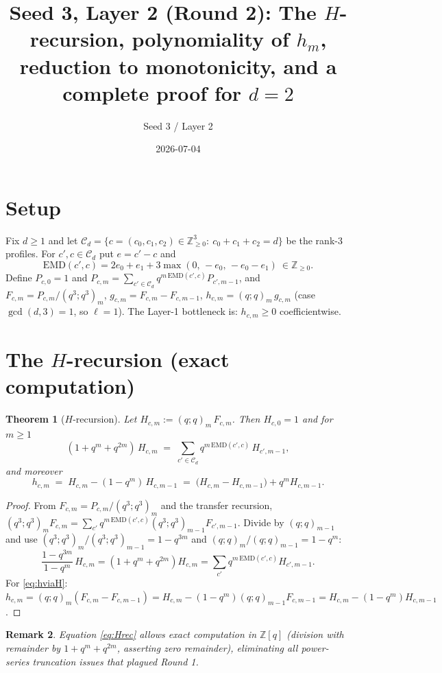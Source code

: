 \documentclass[11pt]{article}
\title{Seed 3, Layer 2 (Round 2): The $H$-recursion, polynomiality of $h_m$,\\
reduction to monotonicity, and a complete proof for $d=2$}
\author{Seed 3 / Layer 2}
\date{2026-07-04}
\newtheorem{theorem}{Theorem}
\newtheorem{remark}[theorem]{Remark}
\begin{document}
\maketitle

\section*{Setup}
Fix $d\ge 1$ and let $\mathcal{C}_d=\{c=(c_0,c_1,c_2)\in\mathbb{Z}_{\ge0}^3:\ c_0+c_1+c_2=d\}$
be the rank-3 profiles. For $c',c\in\mathcal{C}_d$ put $e=c'-c$ and
\[
\mathrm{EMD}(c',c)=2e_0+e_1+3\max(0,\,-e_0,\,-e_0-e_1)\ \in\mathbb{Z}_{\ge0}.
\]
Define $P_{c,0}=1$ and $P_{c,m}=\sum_{c'\in\mathcal{C}_d} q^{m\,\mathrm{EMD}(c',c)}P_{c',m-1}$,
and $F_{c,m}=P_{c,m}/(q^3;q^3)_m$, $g_{c,m}=F_{c,m}-F_{c,m-1}$,
$h_{c,m}=(q;q)_m\,g_{c,m}$ (case $\gcd(d,3)=1$, so $\ell=1$).
The Layer-1 bottleneck is: $h_{c,m}\ge 0$ coefficientwise.

\section{The $H$-recursion (exact computation)}

\begin{theorem}[$H$-recursion]\label{thm:H}
Let $H_{c,m}:=(q;q)_m\,F_{c,m}$. Then $H_{c,0}=1$ and for $m\ge 1$
\begin{equation}\label{eq:Hrec}
(1+q^m+q^{2m})\,H_{c,m}\;=\;\sum_{c'\in\mathcal{C}_d} q^{m\,\mathrm{EMD}(c',c)}\,H_{c',m-1},
\end{equation}
and moreover
\begin{equation}\label{eq:hviaH}
h_{c,m}\;=\;H_{c,m}-(1-q^m)\,H_{c,m-1}\;=\;\bigl(H_{c,m}-H_{c,m-1}\bigr)+q^m H_{c,m-1}.
\end{equation}
\end{theorem}

\begin{proof}
From $F_{c,m}=P_{c,m}/(q^3;q^3)_m$ and the transfer recursion,
$(q^3;q^3)_m F_{c,m}=\sum_{c'}q^{m\,\mathrm{EMD}(c',c)}(q^3;q^3)_{m-1}F_{c',m-1}$.
Divide by $(q;q)_{m-1}$ and use $(q^3;q^3)_m/(q^3;q^3)_{m-1}=1-q^{3m}$ and
$(q;q)_m/(q;q)_{m-1}=1-q^m$:
\[
\frac{1-q^{3m}}{1-q^m}\,H_{c,m}=(1+q^m+q^{2m})H_{c,m}
=\sum_{c'}q^{m\,\mathrm{EMD}(c',c)}H_{c',m-1}.
\]
For \eqref{eq:hviaH}: $h_{c,m}=(q;q)_m(F_{c,m}-F_{c,m-1})
=H_{c,m}-(1-q^m)(q;q)_{m-1}F_{c,m-1}=H_{c,m}-(1-q^m)H_{c,m-1}$.
\end{proof}

\begin{remark}
Equation \eqref{eq:Hrec} allows \emph{exact} computation in $\mathbb{Z}[q]$ (division with
remainder by $1+q^m+q^{2m}$, asserting zero remainder), eliminating all power-series
truncation issues that plagued Round 1.
\end{remark}
\end{document}
